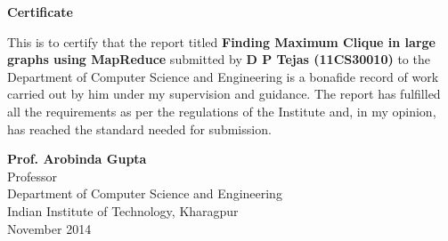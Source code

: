 \thispagestyle{empty}
\begin{center}
\textbf{\LARGE Certificate}
\vspace{4em}
\end{center}
This is to certify that the report titled \textbf{Finding Maximum Clique in large graphs using MapReduce} submitted by \textbf{D P Tejas (11CS30010)} to the Department of Computer Science and Engineering is a bonafide record of work carried out by him under my supervision and guidance. The report has fulfilled all the requirements as per the regulations of the Institute and, in my opinion, has reached the standard needed for submission.

\vspace{18em}

\noindent
\textbf{Prof. Arobinda Gupta}\\
Professor\\
Department of Computer Science and Engineering\\
Indian Institute of Technology, Kharagpur\\
November 2014
